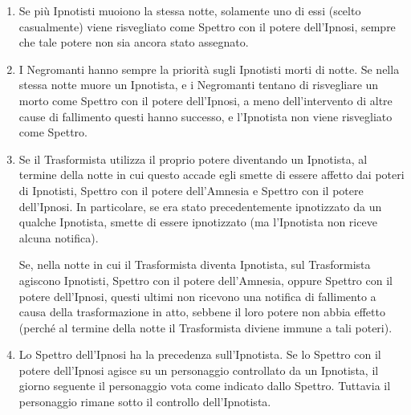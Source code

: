 \documentclass[a4paper,10pt]{article}
\begin{document}
\begin{enumerate}
 \item Se più Ipnotisti muoiono la stessa notte, solamente uno di essi (scelto casualmente) viene risvegliato come Spettro con il potere dell'Ipnosi, sempre che tale potere non sia ancora stato assegnato.
 
 \item I Negromanti hanno sempre la priorità sugli Ipnotisti morti di notte. Se nella stessa notte muore un Ipnotista, e i Negromanti tentano di risvegliare un morto come Spettro con il potere dell'Ipnosi, a meno dell'intervento di altre cause di fallimento questi hanno successo, e l'Ipnotista non viene risvegliato come Spettro.
 
 
 \item Se il Trasformista utilizza il proprio potere diventando un Ipnotista, al termine della notte in cui questo accade egli smette di essere affetto dai poteri di Ipnotisti, Spettro con il potere dell'Amnesia e Spettro con il potere dell'Ipnosi. In particolare, se era stato precedentemente ipnotizzato da un qualche Ipnotista, smette di essere ipnotizzato (ma l'Ipnotista non riceve alcuna notifica).
 
 Se, nella notte in cui il Trasformista diventa Ipnotista, sul Trasformista agiscono Ipnotisti, Spettro con il potere dell'Amnesia, oppure Spettro con il potere dell'Ipnosi, questi ultimi non ricevono una notifica di fallimento a causa della trasformazione in atto, sebbene il loro potere non abbia effetto (perché al termine della notte il Trasformista diviene immune a tali poteri).
 
 \item Lo Spettro dell'Ipnosi ha la precedenza sull'Ipnotista. Se lo Spettro con il potere dell'Ipnosi agisce su un personaggio controllato da un Ipnotista, il giorno seguente il personaggio vota come indicato dallo Spettro. Tuttavia il personaggio rimane sotto il controllo dell'Ipnotista.
 

\end{enumerate}
\end{document}
